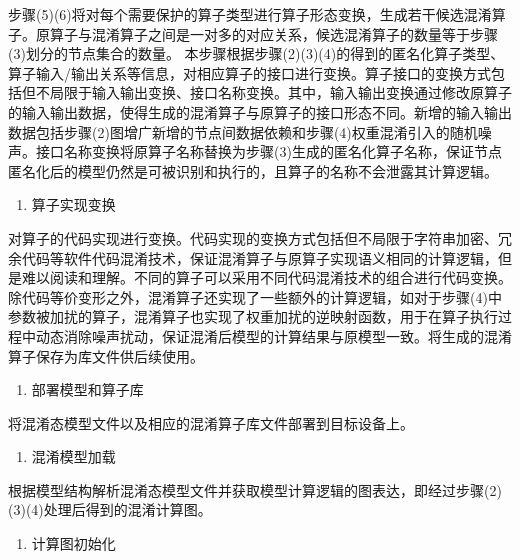 \documentclass[letterpaper,10pt,english]{sphinxmanual}
\begin{document}
\sphinxAtStartPar
步骤(5)(6)将对每个需要保护的算子类型进行算子形态变换，生成若干候选混淆算子。原算子与混淆算子之间是一对多的对应关系，候选混淆算子的数量等于步骤(3)划分的节点集合的数量。
本步骤根据步骤(2)(3)(4)的得到的匿名化算子类型、算子输入/输出关系等信息，对相应算子的接口进行变换。算子接口的变换方式包括但不局限于输入输出变换、接口名称变换。其中，输入输出变换通过修改原算子的输入输出数据，使得生成的混淆算子与原算子的接口形态不同。新增的输入输出数据包括步骤(2)图增广新增的节点间数据依赖和步骤(4)权重混淆引入的随机噪声。接口名称变换将原算子名称替换为步骤(3)生成的匿名化算子名称，保证节点匿名化后的模型仍然是可被识别和执行的，且算子的名称不会泄露其计算逻辑。
\begin{enumerate}
%
\setcounter{enumi}{5}
\item {} 
\sphinxAtStartPar
算子实现变换

\end{enumerate}

\sphinxAtStartPar
对算子的代码实现进行变换。代码实现的变换方式包括但不局限于字符串加密、冗余代码等软件代码混淆技术，保证混淆算子与原算子实现语义相同的计算逻辑，但是难以阅读和理解。不同的算子可以采用不同代码混淆技术的组合进行代码变换。除代码等价变形之外，混淆算子还实现了一些额外的计算逻辑，如对于步骤(4)中参数被加扰的算子，混淆算子也实现了权重加扰的逆映射函数，用于在算子执行过程中动态消除噪声扰动，保证混淆后模型的计算结果与原模型一致。将生成的混淆算子保存为库文件供后续使用。
\begin{enumerate}
%
\setcounter{enumi}{6}
\item {} 
\sphinxAtStartPar
部署模型和算子库

\end{enumerate}

\sphinxAtStartPar
将混淆态模型文件以及相应的混淆算子库文件部署到目标设备上。
\begin{enumerate}
%
\setcounter{enumi}{7}
\item {} 
\sphinxAtStartPar
混淆模型加载

\end{enumerate}

\sphinxAtStartPar
根据模型结构解析混淆态模型文件并获取模型计算逻辑的图表达，即经过步骤(2)(3)(4)处理后得到的混淆计算图。
\begin{enumerate}
%
\setcounter{enumi}{8}
\item {} 
\sphinxAtStartPar
计算图初始化

\end{enumerate}
\end{document}
